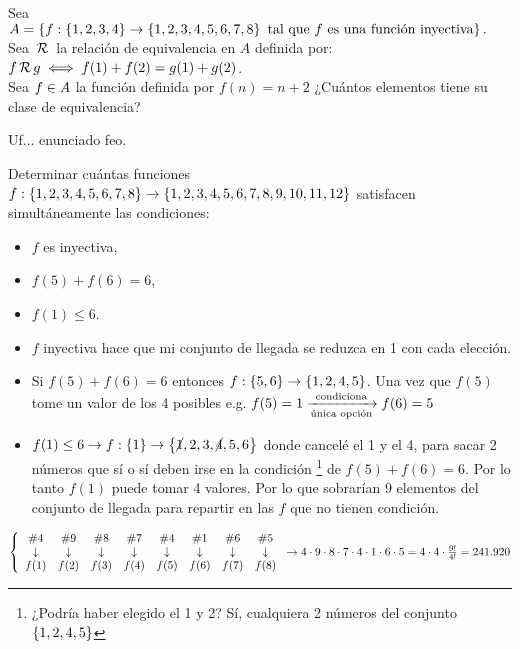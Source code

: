 \documentclass[12pt,a4paper, spanish]{article}
\begin{document}
\ejercicio
Sea $A = \set{f : \set{1,2,3,4} \to \set{1,2,3,4,5,6,7,8} \text{ tal que $f$ es una función inyectiva}}.$\\
Sea $\relacion$ la relación de equivalencia en $A$ definida por: $f \relacion g \sisolosi f(1) + f(2) = g(1) + g(2)$.\\
Sea $f \en A$ la función definida por $f(n) = n+2$ ¿Cuántos elementos tiene su clase de equivalencia?

\separadorCorto

Uf... enunciado feo.\\


\ejercicio

Determinar cuántas funciones $f : \set{1,2,3,4,5,6,7,8} \to \set{\foreach \i in {1,...,11}{ \i, }12}$ satisfacen
simultáneamente las condiciones:\\
\begin{multicols}{3}
	\begin{itemize}
		\item $f$ es inyectiva,
		\item $f(5) + f(6) = 6$,
		\item $f(1) \leq 6$.
	\end{itemize}
\end{multicols}

\separadorCorto

\begin{itemize}
	\item $f$ inyectiva hace que mi conjunto de llegada se reduzca en 1 con cada elección.

	\item Si $f(5) + f(6) = 6$ entonces $f: \set{5,6} \to \set{1,2,4,5}$. Una vez que $f(5)$ tome
	      un valor de los 4 posibles e.g. $f(5) = 1 \flecha{condiciona}[única opción] f(6) = 5 $

	\item $f(1) \leq 6 \to f : \set{1} \to \set{\cancel{1},2,3,\cancel{4},5,6}$ donde cancelé el 1
	      y el 4, para sacar 2 números que sí o sí deben irse en la condición
	      \footnote{¿Podría haber elegido el 1 y 2? Sí, cualquiera 2 números del conjunto $\set{1,2,4,5}$}
	      de $f(5) + f(6) = 6$. Por lo
	      tanto $f(1)$ puede tomar 4 valores. Por lo que sobrarían 9 elementos del conjunto de llegada para repartir
	      en las $f$ que no tienen condición.
\end{itemize}

$\llave{c c c c c c c c}
	{
		\#4 & \#9 & \#8 & \#7 & \#4 & \#1 & \#6 & \#5 \\
		\downarrow & \downarrow & \downarrow &\downarrow & \downarrow & \downarrow &\downarrow &\downarrow\\
		f(1) & f(2) &f(3) &f(4) &f(5) &f(6) & f(7) & f(8)
	}
	\to 4 \cdot 9 \cdot 8 \cdot 7 \cdot 4 \cdot 1 \cdot 6 \cdot 5 = 4 \cdot 4 \cdot \frac{9!}{4!} = 241.920$\\
\end{document}
